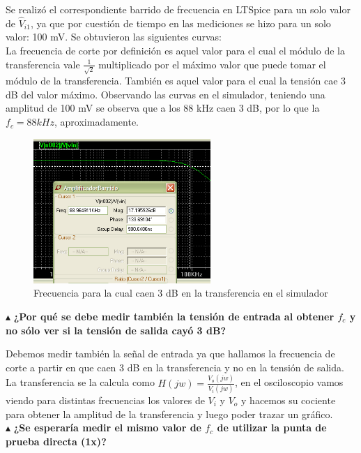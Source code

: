 Se realizó el correspondiente barrido de frecuencia en LTSpice para un solo valor de $\hat{V}_{i1}$, ya que por cuestión de tiempo en las mediciones se hizo para un solo valor: 100 mV. Se obtuvieron las siguientes curvas:\\

La frecuencia de corte por definición es aquel valor para el cual el módulo de la transferencia vale $\frac{1}{\sqrt{2}}$ multiplicado por el máximo valor que puede tomar el módulo de la transferencia. También es aquel valor para el cual la tensión cae 3 dB del valor máximo. Observando las curvas en el simulador, teniendo una amplitud de 100 mV se observa que a los 88 kHz caen 3 dB, por lo que la $f_{c} = 88 kHz$, aproximadamente.

\begin{figure}[H]
  \centering      \includegraphics[width=0.6\textwidth]{gfxhernan/barrido1.PNG}
  \caption{Frecuencia para la cual caen 3 dB en la transferencia en el simulador}
\end{figure}

\noindent$\blacktriangle$\textbf{ ¿Por qué se debe medir también la tensión de entrada al obtener $f_{c}$ y no sólo ver si la tensión de salida cayó 3 dB?}

Debemos medir también la señal de entrada ya que hallamos la frecuencia de corte a partir en que caen 3 dB en la transferencia y no en la tensión de salida. La transferencia se la calcula como $H(jw) = \frac{V_{o}(jw)}{V_{i}(jw)}$, en el osciloscopio vamos viendo para distintas frecuencias los valores de $V_{i}$ y $V_{o}$ y hacemos su cociente para obtener la amplitud de la transferencia y luego poder trazar un gráfico.\\

\noindent$\blacktriangle$\textbf{ ¿Se esperaría medir el mismo valor de $f_{c}$ de utilizar la punta de prueba directa (1x)?}


